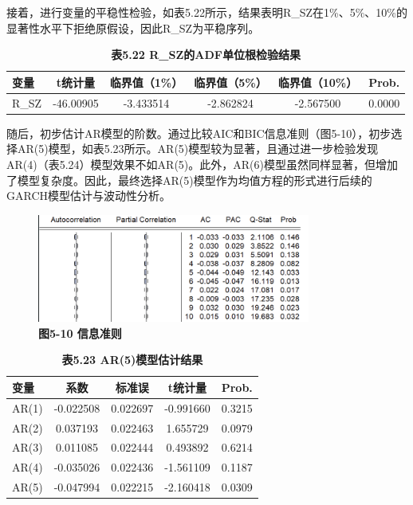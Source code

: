 \documentclass[12pt, a4paper]{article}
\numberwithin{equation}{section}
\begin{document}
接着，进行变量的平稳性检验，如表5.22所示，结果表明R\_SZ在1\%、5\%、10\%的显著性水平下拒绝原假设，因此R\_SZ为平稳序列。

\begin{table}[h!]
    \centering
    \captionsetup{labelformat=empty}
    \caption{\textbf{\fontsize{9pt}{11pt}\selectfont 表5.22 R\_SZ的ADF单位根检验结果}}
    \begin{tabular}{lccccc}
        \toprule
        变量    & t统计量      & 临界值（1\%）  & 临界值（5\%）  & 临界值（10\%） & Prob.  \\
        \midrule
        R\_SZ & -46.00905 & -3.433514 & -2.862824 & -2.567500 & 0.0000 \\
        \bottomrule
    \end{tabular}
\end{table}

随后，初步估计AR模型的阶数。通过比较AIC和BIC信息准则（图5-10），初步选择AR(5)模型，如表5.23所示。AR(5)模型较为显著，且通过进一步检验发现AR(4)（表5.24）模型效果不如AR(5)。此外，AR(6)模型虽然同样显著，但增加了模型复杂度。因此，最终选择AR(5)模型作为均值方程的形式进行后续的GARCH模型估计与波动性分析。

\begin{figure}[h!]
    \centering
    \includegraphics[width=0.8\textwidth]{./img/ar.png}
    \captionsetup{labelformat=empty}
    \caption{\textbf{\fontsize{9pt}{11pt}\selectfont 图5-10 信息准则}}
\end{figure}

\begin{table}[h!]
    \centering
    \captionsetup{labelformat=empty}
    \caption{\textbf{\fontsize{9pt}{11pt}\selectfont 表5.23 AR(5)模型估计结果}}
    \begin{tabular}{lcccc}
        \toprule
        变量    & 系数        & 标准误      & t统计量      & Prob.  \\
        \midrule
        AR(1) & -0.022508 & 0.022697 & -0.991660 & 0.3215 \\
        AR(2) & 0.037193  & 0.022463 & 1.655729  & 0.0979 \\
        AR(3) & 0.011085  & 0.022444 & 0.493892  & 0.6214 \\
        AR(4) & -0.035026 & 0.022436 & -1.561109 & 0.1187 \\
        AR(5) & -0.047994 & 0.022215 & -2.160418 & 0.0309 \\
        \bottomrule
    \end{tabular}
\end{table}
\end{document}
